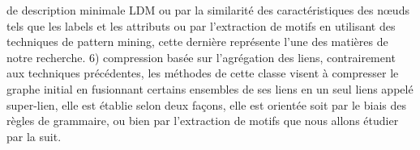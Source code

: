 de description minimale LDM ou par la similarité des caractéristiques des nœuds tels que les
labels et les attributs ou par l’extraction de motifs en utilisant des techniques de pattern mining, cette dernière représente l'une des matières de notre recherche. 6) compression basée sur l'agrégation des liens, contrairement aux techniques précédentes, les méthodes de cette classe visent à compresser le graphe initial en fusionnant certains ensembles de ses liens en un seul liens appelé super-lien, elle est établie selon deux façons, elle est orientée soit par le biais des règles de grammaire, ou bien par l'extraction de motifs que nous allons étudier par la suit.\\


